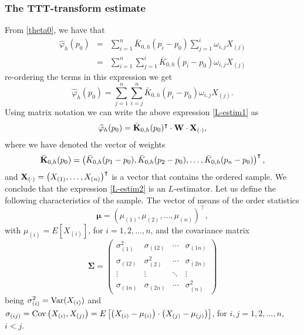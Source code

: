 \documentclass[preprint,12pt]{elsarticle}
\begin{document}
\subsubsection*{The TTT-transform estimate}
\noindent From \eqref{theta0}, we have that
\begin{eqnarray*}
\widehat{\varphi}_h(p_0)&=&\sum_{i=1}^n \bar{K}_{0,h}(p_i-p_0)\sum_{j=1}^i\omega_{i,j}X_{(j)} \\
&=& \sum_{i=1}^n \sum_{j=1}^i \bar{K}_{0,h}(p_i-p_0)\omega_{i,j}X_{(j)} 
\end{eqnarray*}
re-ordering the terms in this expression we get
\begin{equation}\label{L-estim1}
\widehat{\varphi}_h(p_0)=  \sum_{j=1}^n \sum_{i=j}^n \bar{K}_{0,h}(p_i-p_0)\omega_{i,j}X_{(j)}. 
\end{equation}
Using matrix notation we can write the above expression \eqref{L-estim1} as 
\begin{equation}\label{L-estim2}
\widehat{\varphi}_h(p_0)=  \bar{\bf K}_{0,h}(p_0)^{\intercal} \cdot {\bf W} \cdot{\bf X}_{(\cdot)}, 
\end{equation}
where we have denoted the vector of weights 
$$\bar{\bf K}_{0,h}(p_0)=\left(\bar{K}_{0,h}(p_1-p_0), \bar{K}_{0,h}(p_2-p_0),\ldots,\bar{ K}_{0,h}(p_n-p_0)\right)^{\intercal},$$ and ${\bf X}_{(\cdot)}=\left(X_{(1)},\ldots,X_{(n)}\right)^{\intercal}$ is a vector that contains the ordered sample. 
%
\vskip0.3cm
We conclude that the expression \eqref{L-estim2} is an $L$-estimator. Let us define the following characteristics of the sample. The vector of means of the order statistics 
\begin{equation}\label{mean}
\boldsymbol{\mu}=\left({\mu}_{(1)},{\mu}_{(2)},\ldots,{\mu}_{(n)}\right)^{\intercal}, 
\end{equation}
with $\mu_{(i)}=E\left[X_{(i)}\right]$, for $i=1,2,\ldots,n$, and the covariance matrix 
\begin{equation}\label{var}
{\boldsymbol{\Sigma}}=\left(\begin{array}{cccc}
\sigma_{(1)}^2 & \sigma_{(12)} & \cdots & \sigma_{(1n)} \\
\sigma_{(12)} & \sigma_{(2)}^2 & \cdots & \sigma_{(2n)} \\
\vdots & \vdots & \ddots & \vdots \\
\sigma_{(1n)} & \sigma_{(2n)} & \cdots & \sigma_{(n)}^2
\end{array}\right)
\end{equation}
being $\sigma_{(i)}^2={\rm Var}(X_{(i)})$ and $\sigma_{(ij)}={\rm Cov} \left(X_{(i)},X_{(j)} \right)=E\left[\left(X_{(i)}-\mu_{(i)}\right)\cdot\left(X_{(j)}-\mu_{(j)} \right)\right]$, for $i, j= 1,2,\ldots,n$, $i<j$.
\end{document}
